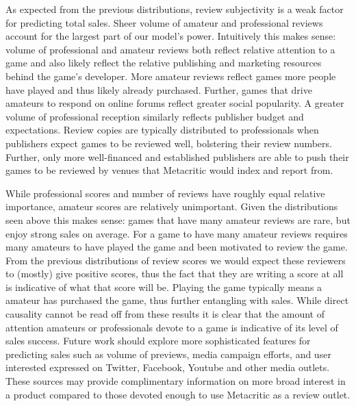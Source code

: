 \documentclass[letterpaper]{article}
\begin{document}
As expected from the previous distributions, review subjectivity is a weak factor for predicting total sales. Sheer volume of amateur and professional reviews account for the largest part of our model's power. Intuitively this makes sense: volume of professional and amateur reviews both reflect relative attention to a game and also likely reflect the relative publishing and marketing resources behind the game's developer. More amateur reviews reflect games more people have played and thus likely already purchased. Further, games that drive amateurs to respond on online forums reflect greater social popularity. A greater volume of professional reception similarly reflects publisher budget and expectations. Review copies are typically distributed to professionals when publishers expect games to be reviewed well, bolstering their review numbers. Further, only more well-financed and established publishers are able to push their games to be reviewed by venues that Metacritic would index and report from.

While professional scores and number of reviews have roughly equal relative importance, amateur scores are relatively unimportant. Given the distributions seen above this makes sense: games that have many amateur reviews are rare, but enjoy strong sales on average. For a game to have many amateur reviews requires many amateurs to have played the game and been motivated to review the game. From the previous distributions of review scores we would expect these reviewers to (mostly) give positive scores, thus the fact that they are writing a score at all is indicative of what that score will be. Playing the game typically means a amateur has purchased the game, thus further entangling with sales. While direct causality cannot be read off from these results it is clear that the amount of attention amateurs or professionals devote to a game is indicative of its level of sales success. Future work should explore more sophisticated features for predicting sales such as volume of previews, media campaign efforts, and user interested expressed on Twitter, Facebook, Youtube and other media outlets. These sources may provide complimentary information on more broad interest in a product compared to those devoted enough to use Metacritic as a review outlet.
\end{document}
